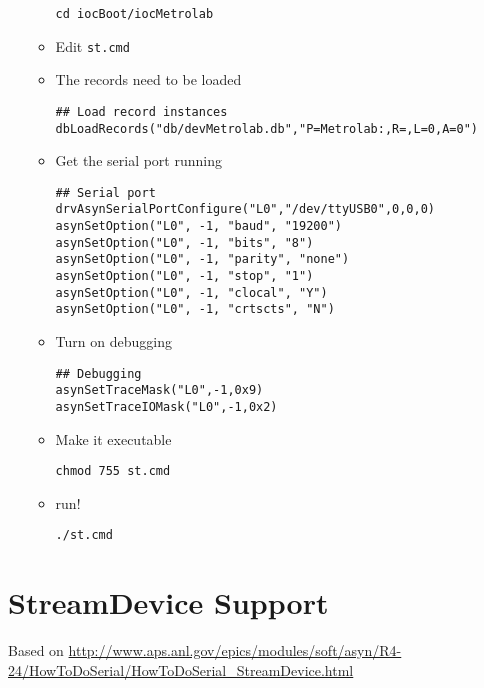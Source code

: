 \documentclass[11pt]{article}
\begin{document}
\begin{enumerate}
\begin{itemize}
\begin{verbatim}
cd iocBoot/iocMetrolab
\end{verbatim}
\item Edit \verb~st.cmd~
\item The records need to be loaded
\begin{verbatim}
## Load record instances
dbLoadRecords("db/devMetrolab.db","P=Metrolab:,R=,L=0,A=0")
\end{verbatim}
\item Get the serial port running
\begin{verbatim}
## Serial port
drvAsynSerialPortConfigure("L0","/dev/ttyUSB0",0,0,0) 
asynSetOption("L0", -1, "baud", "19200") 
asynSetOption("L0", -1, "bits", "8") 
asynSetOption("L0", -1, "parity", "none") 
asynSetOption("L0", -1, "stop", "1") 
asynSetOption("L0", -1, "clocal", "Y") 
asynSetOption("L0", -1, "crtscts", "N")
\end{verbatim}
\item Turn on debugging
\begin{verbatim}
## Debugging
asynSetTraceMask("L0",-1,0x9) 
asynSetTraceIOMask("L0",-1,0x2)
\end{verbatim}
\item Make it executable
\begin{verbatim}
chmod 755 st.cmd
\end{verbatim}
\item run!
\begin{verbatim}
./st.cmd
\end{verbatim}
\end{itemize}
\end{enumerate}
\section{StreamDevice Support}
\label{sec-2}
Based on
\url{http://www.aps.anl.gov/epics/modules/soft/asyn/R4-24/HowToDoSerial/HowToDoSerial_StreamDevice.html}
\end{document}
